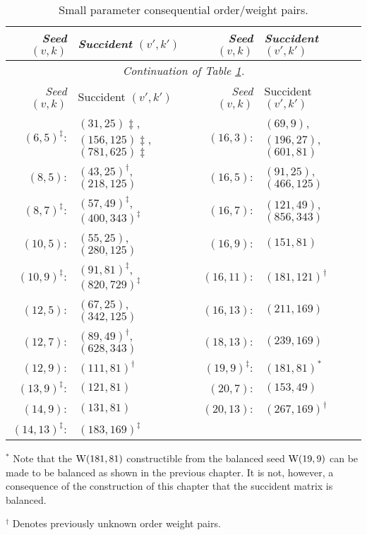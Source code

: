 \documentclass[../../../main]{subfiles}
\begin{document}
\begin{small}
\begin{longtable}[c]{rl|rl}
 \caption{Small parameter consequential order/weight pairs.\label{weighing-table}}\\

{\it Seed} $(v,k)$ & {\it Succident} $(v',k')$ & {\it Seed} $(v,k)$ & {\it Succident} $(v',k')$ \\
\hline
 \endfirsthead

 \multicolumn{4}{c}{\it Continuation of Table \ref{weighing-table}.}\\
 {\it Seed} $(v,k)$ & Succident $(v',k')$ & {\it Seed} $(v,k)$ & Succident $(v',k')$ \\
 \hline
 \endhead

 \endfoot

$(6,5)^\ddag$: & $(31,25)\ddag$, $(156,125)\ddag$, $(781,625)\ddag$ & $(16,3)$: & $(69,9)$, $(196,27)$, $(601,81)$ \\
$(8,5)$: & $(43,25)^\dag$, $(218,125)$ & $(16,5)$: & $(91,25)$, $(466,125)$ \\
$(8,7)^\ddag$: & $(57,49)^\ddag$, $(400,343)^\ddag$ & $(16,7)$: & $(121,49)$, $(856,343)$ \\
$(10,5)$: & $(55,25)$, $(280,125)$ & $(16,9)$: & $(151,81)$ \\
$(10,9)^\ddag$: & $(91,81)^\ddag$, $(820,729)^\ddag$ & $(16,11)$: & $(181,121)^\dag$ \\
$(12,5)$: & $(67,25)$, $(342,125)$ & $(16,13)$: & $(211,169)$ \\
$(12,7)$: & $(89,49)^\dag$, $(628,343)$ & $(18,13)$: & $(239,169)$ \\
$(12,9)$: & $(111,81)^\dag$ & $(19,9)^\ddag$: & $(181,81)^*$ \\
$(13,9)^\ddag$: & $(121,81)$ & $(20,7)$: & $(153,49)$ \\
$(14,9)$: & $(131,81)$ & $(20,13)$: & $(267,169)^\dag$ \\
$(14,13)^\ddag$: & $(183,169)^\ddag$ & & \\

\end{longtable}
\end{small}

$^*$ Note that the $\text{W}(181,81)$ constructible from the balanced seed $\text{W}(19,9)$ can be made to be balanced as shown in the previous chapter. It is not, however, a consequence of the construction of this chapter that the succident matrix is balanced.

$^\dag$ Denotes previously unknown order weight pairs.
\end{document}
